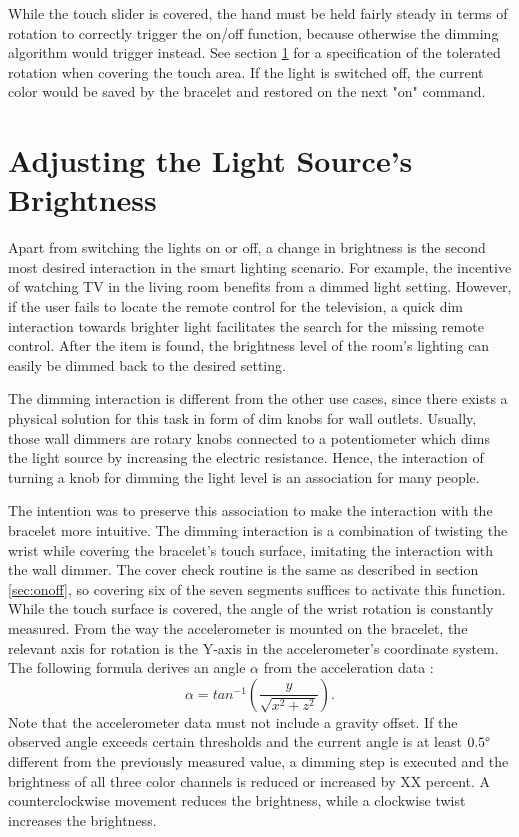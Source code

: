 While the touch slider is covered, the hand must be held fairly steady in terms of rotation to correctly trigger the on/off function, because otherwise the dimming algorithm would trigger instead. See section \ref{sec:dimming} for a specification of the tolerated rotation when covering the touch area. If the light is switched off, the current color would be saved by the bracelet and restored on the next "on" command.

\section{Adjusting the Light Source's Brightness}
\label{sec:dimming}
Apart from switching the lights on or off, a change in brightness is the second most desired interaction in the smart lighting scenario. For example, the incentive of watching TV in the living room benefits from a dimmed light setting. However, if the user fails to locate the remote control for the television, a quick dim interaction towards brighter light facilitates the search for the missing remote control. After the item is found, the brightness level of the room's lighting can easily be dimmed back to the desired setting.

The dimming interaction is different from the other use cases, since there exists a physical solution for this task in form of dim knobs for wall outlets. Usually, those wall dimmers are rotary knobs connected to a potentiometer which dims the light source by increasing the electric resistance. Hence, the interaction of turning a knob for dimming the light level is an association for many people.

The intention was to preserve this association to make the interaction with the bracelet more intuitive. The dimming interaction is a combination of twisting the wrist while covering the bracelet's touch surface, imitating the interaction with the wall dimmer. The cover check routine is the same as described in section \ref{sec:onoff}, so covering six of the seven segments suffices to activate this function. While the touch surface is covered, the angle of the wrist rotation is constantly measured. From the way the accelerometer is mounted on the bracelet, the relevant axis for rotation is the Y-axis in the accelerometer's coordinate system. The following formula derives an angle $\alpha$ from the acceleration data \cite{Abayarjoo2013}:
\[ 
\alpha = tan^{-1}\left(\frac{y}{\sqrt{x^2 + z^2}}\right).
\]
Note that the accelerometer data must not include a gravity offset. If the observed angle exceeds certain thresholds and the current angle is at least $0.5\degree$ different from the previously measured value, a dimming step is executed and the brightness of all three color channels is reduced or increased by XX percent. A counterclockwise movement reduces the brightness, while a clockwise twist increases the brightness.

